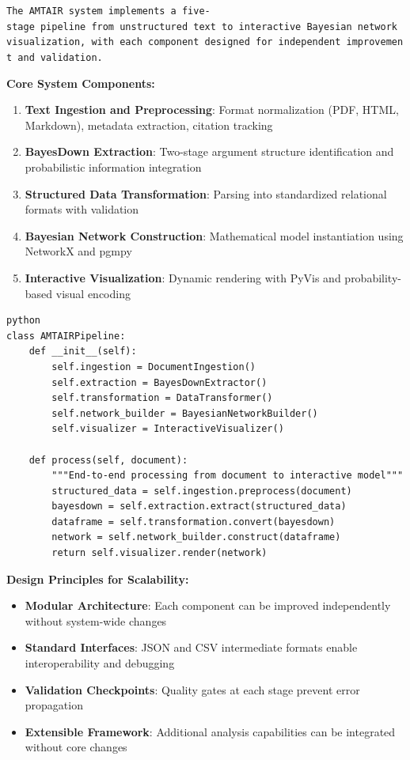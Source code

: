 \documentclass[
  11pt,
  letterpaper,
]{book}
\providecommand{\tightlist}{%
  \setlength{\itemsep}{0pt}\setlength{\parskip}{0pt}}
\begin{document}
\texttt{The\ AMTAIR\ system\ implements\ a\ five-stage\ pipeline\ from\ unstructured\ text\ to\ interactive\ Bayesian\ network\ visualization,\ with\ each\ component\ designed\ for\ independent\ improvement\ and\ validation.}

\textbf{Core System Components:}

\begin{enumerate}
\def\labelenumi{\arabic{enumi}.}
\tightlist
\item
  \textbf{Text Ingestion and Preprocessing}: Format normalization (PDF,
  HTML, Markdown), metadata extraction, citation tracking
\item
  \textbf{BayesDown Extraction}: Two-stage argument structure
  identification and probabilistic information integration
\item
  \textbf{Structured Data Transformation}: Parsing into standardized
  relational formats with validation
\item
  \textbf{Bayesian Network Construction}: Mathematical model
  instantiation using NetworkX and pgmpy
\item
  \textbf{Interactive Visualization}: Dynamic rendering with PyVis and
  probability-based visual encoding
\end{enumerate}

\begin{verbatim}
python
class AMTAIRPipeline:
    def __init__(self):
        self.ingestion = DocumentIngestion()
        self.extraction = BayesDownExtractor() 
        self.transformation = DataTransformer()
        self.network_builder = BayesianNetworkBuilder()
        self.visualizer = InteractiveVisualizer()
    
    def process(self, document):
        """End-to-end processing from document to interactive model"""
        structured_data = self.ingestion.preprocess(document)
        bayesdown = self.extraction.extract(structured_data)
        dataframe = self.transformation.convert(bayesdown)
        network = self.network_builder.construct(dataframe)
        return self.visualizer.render(network)
\end{verbatim}

\textbf{Design Principles for Scalability:}

\begin{itemize}
\tightlist
\item
  \textbf{Modular Architecture}: Each component can be improved
  independently without system-wide changes
\item
  \textbf{Standard Interfaces}: JSON and CSV intermediate formats enable
  interoperability and debugging
\item
  \textbf{Validation Checkpoints}: Quality gates at each stage prevent
  error propagation
\item
  \textbf{Extensible Framework}: Additional analysis capabilities can be
  integrated without core changes
\end{itemize}
\end{document}
